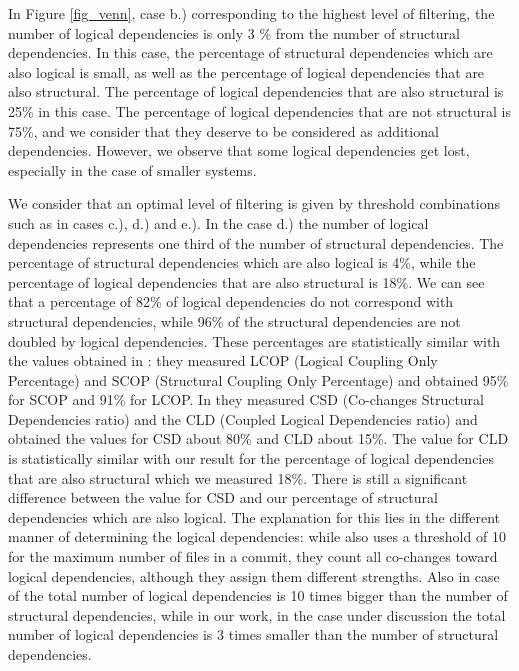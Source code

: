 \documentclass[a4paper,twoside]{article}
\begin{document}
In Figure \ref{fig_venn}, case b.) corresponding to the highest level of filtering, the number of logical dependencies is only 3 \% from  the number of structural dependencies. In this case, the percentage of structural dependencies which are also logical is small, as well as the percentage of logical dependencies that are also structural.  The percentage of logical dependencies that are also structural is 25\% in this case. The percentage of logical dependencies that are not structural is 75\%, and we consider that they deserve to be considered as additional dependencies. However, we observe that some logical dependencies get lost, especially in the case of smaller systems.

We consider that an optimal level of filtering is given by threshold combinations such as in cases c.), d.) and e.).  In the case d.) the number of logical dependencies represents one third of the number of structural dependencies. The percentage of structural dependencies which are also logical is 4\%,  while the percentage of logical dependencies that are also structural is 18\%. We can see that a percentage of 82\% of logical dependencies do not correspond with  structural dependencies, while 96\% of the structural dependencies are not doubled by logical dependencies. These percentages are statistically similar with the values obtained in \cite{Oliva:2011:ISL:2067853.2068086}: they measured LCOP (Logical Coupling Only Percentage)  and SCOP (Structural Coupling Only Percentage) and obtained 95\% for SCOP and 91\% for LCOP. In \cite{DBLP:journals/jss/AjienkaC17} they  measured CSD (Co-changes Structural Dependencies ratio) and the CLD (Coupled Logical Dependencies ratio) and obtained the values for CSD about 80\% and CLD about 15\%. The value for CLD is statistically similar with our result for the percentage of logical dependencies that are also structural which we measured 18\%. There is still a significant difference between the value for CSD and our percentage of structural dependencies which are also logical. The explanation for this lies in the different manner of determining the logical dependencies: while \cite{DBLP:journals/jss/AjienkaC17} also uses a threshold of 10 for the maximum number of files in a commit, they count all co-changes toward logical dependencies, although they assign them different strengths. Also in case of \cite{DBLP:journals/jss/AjienkaC17}  the total number of logical dependencies is 10 times bigger than the number of structural dependencies, while in our work, in the case under discussion the total number of logical dependencies is 3 times smaller than the number of structural dependencies.  
\end{document}
